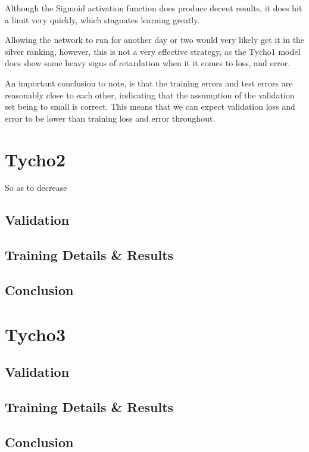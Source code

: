 \documentclass[12pt,a4paper,oneside,oldfontcommands]{memoir}
\begin{document}
Although the Sigmoid activation function does produce decent results, it does hit a limit very quickly, which stagnates
learning greatly.

Allowing the network to run for another day or two would very likely get it in the silver ranking, however, this is not a very effective strategy, as the Tycho1 model does show some heavy signs of retardation when it it comes to loss, and error.

An important conclusion to note, is that the training errors and test errors are reasonably close to each other, indicating that the assumption of the validation set being to small is correct. This means that we can expect validation loss and error to be lower than training loss and error throughout.

\chapter{Tycho2}


So as to decrease 

\section{Validation}

\section{Training Details & Results}

\section{Conclusion}

\chapter{Tycho3}


\section{Validation}

\section{Training Details & Results}

\section{Conclusion}
\end{document}

